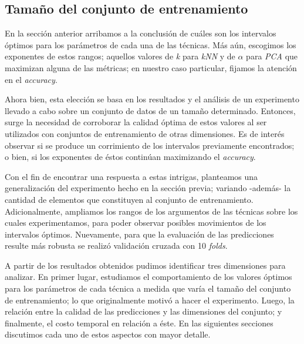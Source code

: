 \subsection{Tamaño del conjunto de entrenamiento}\label{fer}
En la sección anterior arribamos a la conclusión de cuáles son los intervalos óptimos para los parámetros de cada una de las técnicas. Más aún, escogimos los exponentes de estos rangos; aquellos valores de \emph{k} para \emph{kNN} y de $\alpha$ para \emph{PCA} que maximizan alguna de las métricas; en nuestro caso particular, fijamos la atención en el \emph{accuracy}. 
\par
Ahora bien, esta elección se basa en los resultados y el análisis de un experimento llevado a cabo sobre un conjunto de datos de un tamaño determinado. Entonces, surge la necesidad de corroborar la calidad óptima de estos valores al ser utilizados con conjuntos de entrenamiento de otras dimensiones. Es de interés observar si se produce un corrimiento de los intervalos previamente encontrados; o bien, si los exponentes de éstos continúan maximizando el \emph{accuracy}. 
\par
Con el fin de encontrar una respuesta a estas intrigas, planteamos una generalización del experimento hecho en la sección previa; variando -además- la cantidad de elementos que constituyen al conjunto de entrenamiento. Adicionalmente, ampliamos los rangos de los argumentos de las técnicas sobre los cuales experimentamos, para poder observar posibles movimientos de los intervalos óptimos. Nuevamente, para que la evaluación de las predicciones resulte más robusta se realizó validación cruzada con 10 \emph{folds}.
\par
A partir de los resultados obtenidos pudimos identificar tres dimensiones para analizar. En primer lugar, estudiamos el comportamiento de los valores óptimos para los parámetros de cada técnica a medida que varía el tamaño del conjunto de entrenamiento; lo que originalmente motivó a hacer el experimento. Luego, la relación entre la calidad de las predicciones y las dimensiones del conjunto; y finalmente, el costo temporal en relación a éste. En las siguientes secciones discutimos cada uno de estos aspectos con mayor detalle.

